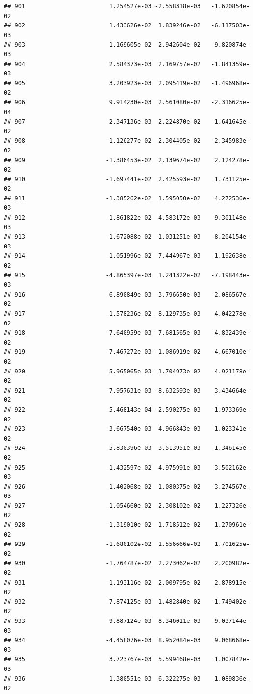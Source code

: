 \documentclass[
]{article}
\begin{document}
\begin{verbatim}
## 901                        1.254527e-03 -2.558318e-03   -1.620854e-02
## 902                        1.433626e-02  1.839246e-02   -6.117503e-03
## 903                        1.169605e-02  2.942604e-02   -9.820874e-03
## 904                        2.584373e-03  2.169757e-02   -1.841359e-03
## 905                        3.203923e-03  2.095419e-02   -1.496968e-02
## 906                        9.914230e-03  2.561080e-02   -2.316625e-04
## 907                        2.347136e-03  2.224870e-02    1.641645e-02
## 908                       -1.126277e-02  2.304405e-02    2.345983e-02
## 909                       -1.386453e-02  2.139674e-02    2.124278e-02
## 910                       -1.697441e-02  2.425593e-02    1.731125e-02
## 911                       -1.385262e-02  1.595050e-02    4.272536e-03
## 912                       -1.861822e-02  4.583172e-03   -9.301148e-03
## 913                       -1.672088e-02  1.031251e-03   -8.204154e-03
## 914                       -1.051996e-02  7.444967e-03   -1.192638e-02
## 915                       -4.865397e-03  1.241322e-02   -7.198443e-03
## 916                       -6.890849e-03  3.796650e-03   -2.086567e-02
## 917                       -1.578236e-02 -8.129735e-03   -4.042278e-02
## 918                       -7.640959e-03 -7.681565e-03   -4.832439e-02
## 919                       -7.467272e-03 -1.086919e-02   -4.667010e-02
## 920                       -5.965065e-03 -1.704973e-02   -4.921178e-02
## 921                       -7.957631e-03 -8.632593e-03   -3.434664e-02
## 922                       -5.468143e-04 -2.590275e-03   -1.973369e-02
## 923                       -3.667540e-03  4.966843e-03   -1.023341e-02
## 924                       -5.830396e-03  3.513951e-03   -1.346145e-02
## 925                       -1.432597e-02  4.975991e-03   -3.502162e-03
## 926                       -1.402068e-02  1.080375e-02    3.274567e-03
## 927                       -1.054660e-02  2.308102e-02    1.227326e-02
## 928                       -1.319010e-02  1.718512e-02    1.270961e-02
## 929                       -1.680102e-02  1.556666e-02    1.701625e-02
## 930                       -1.764787e-02  2.273062e-02    2.200982e-02
## 931                       -1.193116e-02  2.009795e-02    2.878915e-02
## 932                       -7.874125e-03  1.482840e-02    1.749402e-02
## 933                       -9.887124e-03  8.346011e-03    9.037144e-03
## 934                       -4.458076e-03  8.952084e-03    9.068668e-03
## 935                        3.723767e-03  5.599468e-03    1.007842e-03
## 936                        1.380551e-03  6.322275e-03    1.089836e-02

\end{verbatim}
\end{document}
